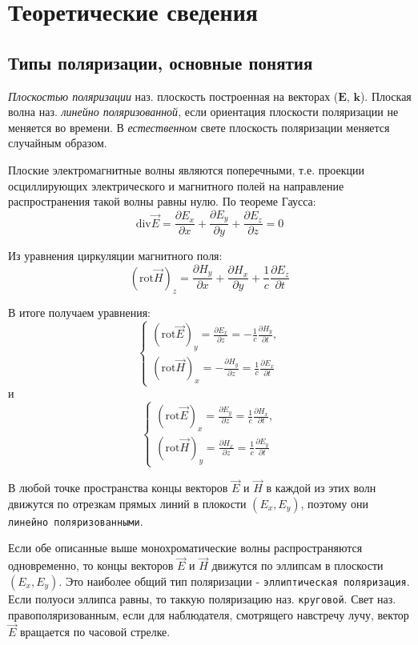 \documentclass[a4paper,12pt]{article}
\begin{document}
\section{Теоретические сведения}

\subsection{Типы поляризации, основные понятия}
\textit{Плоскостью поляризации} наз. плоскость построенная на векторах ($\mathbf{E}$, $\mathbf{k}$). Плоская волна наз. \textit{линейно поляризованной}, если ориентация плоскости поляризации не меняется во времени. В \textit{естественном} свете плоскость поляризации меняется случайным образом.

Плоские электромагнитные волны являются поперечными, т.е. проекции осциллирующих электрического и магнитного полей на направление распространения такой волны равны нулю. По теореме Гаусса:
$$
\text{div}\vec{E}=\frac{\partial E_x}{\partial x}+\frac{\partial E_y}{\partial y}+\frac{\partial E_z}{\partial z}=0
$$

Из уравнения циркуляции магнитного поля:
$$
(\text{rot}\vec{H})_z=\frac{\partial H_y}{\partial x}+\frac{\partial H_x}{\partial y}+\frac{1}{c}\frac{\partial E_z}{\partial t}
$$

В итоге получаем уравнения:
$$
\left\{ 
\begin{array}{ll} 
(\text{rot}\vec{E})_y=\frac{\partial E_x}{\partial z}=-\frac{1}{c}\frac{\partial H_y}{\partial t}, \\
(\text{rot}\vec{H})_x=-\frac{\partial H_y}{\partial z}=\frac{1}{c}\frac{\partial E_x}{\partial t}\end{array}\right.
$$
и
$$
\left\{ 
\begin{array}{ll} 
(\text{rot}\vec{E})_x=\frac{\partial E_y}{\partial z}=\frac{1}{c}\frac{\partial H_x}{\partial t}, \\
(\text{rot}\vec{H})_y=\frac{\partial H_x}{\partial z}=\frac{1}{c}\frac{\partial E_y}{\partial t}\end{array}\right.
$$

В любой точке пространства концы векторов $\vec{E}$ и $\vec{H}$ в каждой из этих волн движутся по отрезкам прямых линий в плокости $(E_x, E_y)$, поэтому они \texttt{линейно поляризованными}.

Если обе описанные выше монохроматические волны распространяются одновременно, то концы векторов $\vec{E}$ и $\vec{H}$ движутся по эллипсам в плоскости $(E_x, E_y)$. Это наиболее общий тип поляризации - \texttt{эллиптическая поляризация}. Если полуоси эллипса равны, то таккую поляризацию наз. \texttt{круговой}. Свет наз. правополяризованным, если для наблюдателя, смотрящего навстречу лучу, вектор $\vec{E}$ вращается по часовой стрелке. 
\end{document}

